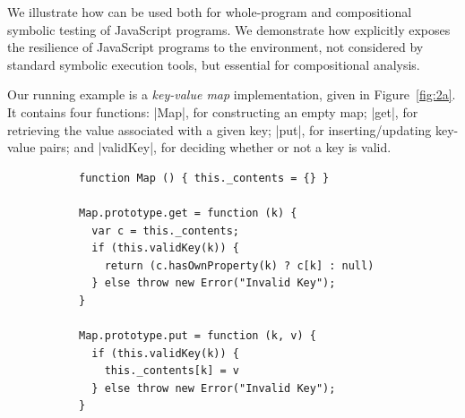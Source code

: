 
We illustrate how \cosette can be used both for whole-program and compositional symbolic testing of JavaScript programs. We demonstrate how \cosette  explicitly exposes the resilience of JavaScript programs to the environment, not considered by standard symbolic execution tools, but essential for compositional analysis.

Our running example is a \emph{key-value map} implementation, given in Figure~\ref{fig:2a}. It contains four functions: 
\jsinline|Map|, for constructing an empty map;
\jsinline|get|, for retrieving the value associated with a given key;
\jsinline|put|, for inserting/updating key-value pairs; and \jsinline|validKey|, for deciding whether or not a key is valid.

 \begin{figure}[t]
 \centering
 \begin{subfigure}[b]{0.33\textwidth}
 {
 \begin{lstlisting}
function Map () { this._contents = {} }

Map.prototype.get = function (k) {
  var c = this._contents;
  if (this.validKey(k)) {
    return (c.hasOwnProperty(k) ? c[k] : null)
  } else throw new Error("Invalid Key");
}

Map.prototype.put = function (k, v) {
  if (this.validKey(k)) {  
    this._contents[k] = v   
  } else throw new Error("Invalid Key");
} 


\end{lstlisting}}
\end{subfigure}
\end{figure}
